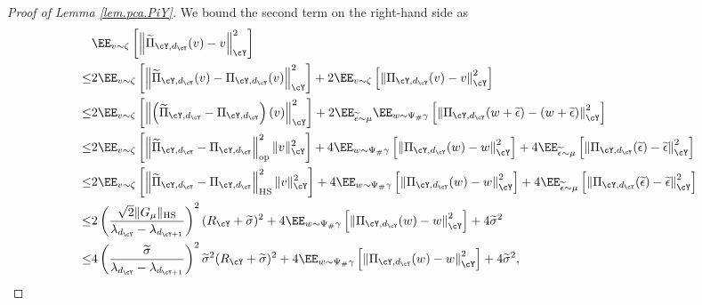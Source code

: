 \documentclass[11pt]{article} %
\begin{document}
\begin{proof}[Proof of Lemma \ref{lem.pca.PiY}]
	We bound the second term on the right-hand side as
	\begin{align}
		&\EE_{v \sim \zeta} \left[ \left\|\widetilde{\Pi}_{\cY,d_{\cY}}(v)-v\right\|_{\cY}^2\right] \nonumber\\
		\leq & 2\EE_{v\sim \zeta} \left[ \left\|\widetilde{\Pi}_{\cY,d_{\cY}}(v)-\Pi_{\cY,d_{\cY}}(v)\right\|_{\cY}^2 \right] +2\EE_{v\sim \zeta}\left[ \left\|\Pi_{\cY,d_{\cY}}(v)-v\right\|_{\cY}^2 \right]\nonumber\\
		\leq & 2\EE_{v\sim \zeta} \left[ \left\|\left(\widetilde{\Pi}_{\cY,d_{\cY}}-\Pi_{\cY,d_{\cY}}\right)(v)\right\|_{\cY}^2 \right] +2\EE_{\widetilde{\epsilon}\sim \mu}\EE_{w \sim \Psi_{\#}\gamma} \left[ \left\|\Pi_{\cY,d_{\cY}}(w+\widetilde{\epsilon})-(w+\widetilde{\epsilon})\right\|_{\cY}^2 \right]\nonumber\\
		\leq & 2\EE_{v\sim \zeta} \left[ \left\|\widetilde{\Pi}_{\cY,d_{\cY}}-\Pi_{\cY,d_{\cY}}\right\|_{\rm op}^2\|v\|_{\cY}^2\right] + 4\EE_{w\sim \Psi_{\#}\gamma} \left[ \left\|\Pi_{\cY,d_{\cY}}(w)-w\right\|_{\cY}^2 \right] + 4 \EE_{\widetilde{\epsilon}\sim \mu} \left[ \left\|\Pi_{\cY,d_{\cY}}(\widetilde{\epsilon})-\widetilde{\epsilon}\right\|_{\cY}^2 \right] \nonumber\\
		\leq & 2\EE_{v\sim \zeta} \left[ \left\|\widetilde{\Pi}_{\cY,d_{\cY}}-\Pi_{\cY,d_{\cY}}\right\|_{\rm HS}^2\|v\|_{\cY}^2 \right] + 4\EE_{w\sim \Psi_{\#}\gamma}\left[ \left\|\Pi_{\cY,d_{\cY}}(w)-w\right\|_{\cY}^2 \right] + 4 \EE_{\widetilde{\epsilon}\sim \mu} \left[ \left\|\Pi_{\cY,d_{\cY}}(\widetilde{\epsilon})-\widetilde{\epsilon}\right\|_{\cY}^2 \right] \nonumber\\
		\leq & 2\left(\frac{\sqrt{2}\|G_{\mu}\|_{\rm HS}}{\lambda_{d_{\cY}}-\lambda_{d_{\cY+1}}}\right)^2(R_{\cY}+\widetilde{\sigma})^2 + 4\EE_{w \sim \Psi_{\#}\gamma} \left[ \left\|\Pi_{\cY,d_{\cY}}(w)-w\right\|_{\cY}^2\right] + 4\widetilde{\sigma}^2 \nonumber\\
		\leq & 4\left(\frac{\widetilde{\sigma}}{\lambda_{d_{\cY}}-\lambda_{d_{\cY+1}}}\right)^2\widetilde{\sigma}^2(R_{\cY}+\widetilde{\sigma})^2+ 4\EE_{w \sim \Psi_{\#}\gamma} \left[ \left\|\Pi_{\cY,d_{\cY}}(w)-w\right\|_{\cY}^2 \right] + 4\widetilde{\sigma}^2,
		\label{eq.PCA.Y}
	\end{align}

\end{proof}
\end{document}
